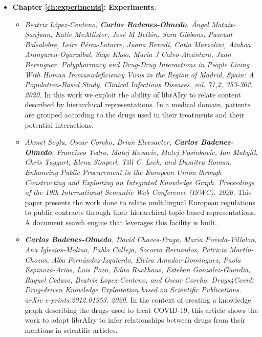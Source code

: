 \begin{itemize}
\begin{itemize}
\end{itemize}
\item \textbf{Chapter \ref{ch:experiments}: Experiments}:
\begin{itemize}
\item \textit{Beatriz López-Centeno, \textbf{Carlos Badenes-Olmedo}, Ángel Mataix-Sanjuan, Katie McAllister, José M Bellón, Sara Gibbons, Pascual Balsalobre, Leire Pérez-Latorre, Juana Benedí, Catia Marzolini, Ainhoa Aranguren-Oyarzábal, Saye Khoo, María J Calvo-Alcántara, Juan Berenguer. \textit{Polypharmacy and Drug-Drug Interactions in People Living With Human Immunodeficiency Virus in the Region of Madrid, Spain: A Population-Based Study}. Clinical Infectious Diseases. vol. 71,2, 353-362. 2020.} In this work we exploit the ability of librAIry to relate content described by hierarchical representations. In a medical domain, patients are grouped according to the drugs used in their treatments and their potential interactions.
\item \textit{Ahmet Soylu, Oscar Corcho, Brian Elvesaeter, \textbf{Carlos Badenes-Olmedo}, Francisco Yedro, Matej Kovacic, Matej Posinkovic, Ian Makgill, Chris Taggart, Elena Simperl, Till C. Lech, and Dumitru Roman. \textit{Enhancing Public Procurement in the European Union through Constructing and Exploiting an Integrated Knowledge Graph}. Proceedings of the 19th International Semantic Web Conference (ISWC). 2020.} This paper presents the work done to relate multilingual European regulations to public contracts through their hierarchical topic-based representations. A document search engine that leverages this facility is built.  
\item \textit{\textbf{Carlos Badenes-Olmedo}, David Chaves-Fraga, Maria Poveda-Villalon, Ana Iglesias-Molina, Pablo Calleja, Socorro Bernardos, Patricia Martín-Chozas, Alba Fernández-Izquierdo, Elvira Amador-Dominguez, Paola Espinoza-Arias, Luis Pozo, Edna Ruckhaus, Esteban Gonzalez-Guardia, Raquel Cedazo, Beatriz Lopez-Centeno, and Oscar Corcho. \textit{Drugs4Covid: Drug-driven Knowledge Exploitation based on Scientific Publications}. arXiv e-prints:2012.01953. 2020.} In the context of creating a knowledge graph describing the drugs used to treat COVID-19, this article shows the work to adapt librAIry to infer relationships between drugs from their mentions in scientific articles. 
\end{itemize}
\end{itemize}




